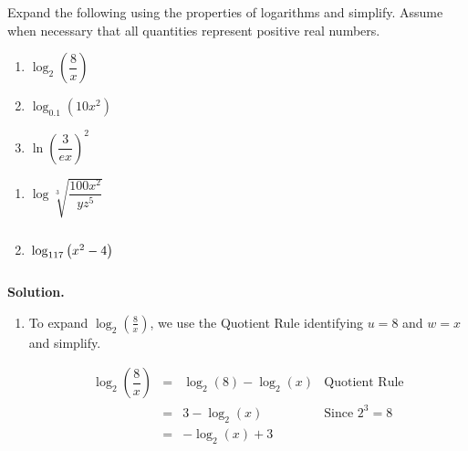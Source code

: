 \begin{ex}  \label{expandlogex} Expand the following using the properties of logarithms and simplify.  Assume when necessary that all quantities represent positive real numbers.

\begin{multicols}{3}
\begin{enumerate}

\item $\log_{2}\left(\dfrac{8}{x}\right)$ 

\item $\log_{0.1} \left(10 x^2 \right)$ 

\item  $\ln \left(\dfrac{3}{ex}\right)^2$

\setcounter{HW}{\value{enumi}}
\end{enumerate}
\end{multicols}

\begin{multicols}{3}
\begin{enumerate}
\setcounter{enumi}{\value{HW}}

\item  $\log \sqrt[3]{\dfrac{100 x^2}{yz^5}}$

\item  $\vphantom{\log \sqrt[3]{\dfrac{100 x^2}{yz^5}}} \log_{117}\left(x^2 - 4\right)$

\setcounter{HW}{\value{enumi}}
\end{enumerate}
\end{multicols}

{\bf Solution.}

\begin{enumerate}


\item  To expand $\log_{2}\left(\frac{8}{x}\right)$, we use the Quotient Rule identifying $u = 8$ and $w=x$ and simplify.

\setlength{\extrarowheight}{6pt}
\[ \begin{array}{rclr}

\log_{2}\left(\dfrac{8}{x}\right) & = &  \log_{2}(8) - \log_{2}(x) & \mbox{Quotient Rule} \\

& = &  3 - \log_{2}(x) & \mbox{Since $2^{3} = 8$} \\

& = & - \log_{2}(x) + 3 & \\


\end{array}\]
\end{enumerate}
\end{ex}
